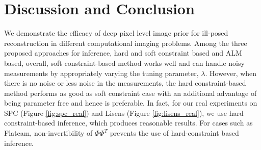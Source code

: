 \documentclass[journal,twoside]{IEEEtran}
\begin{document}
\begin{comment}




\end{comment}


\section{Discussion and Conclusion}
We demonstrate the efficacy of deep pixel level image prior for ill-posed reconstruction in different computational imaging problems. Among the three proposed approaches for inference, hard and soft constraint based and ALM based, overall, soft constraint-based method works well and can handle noisy measurements by appropriately varying the tuning parameter, $\lambda$. However, when there is no noise or less noise in the measurements, the hard constraint-based method performs as good as soft constraint case with an additional advantage of being parameter free and hence is preferable. In fact, for our real experiments on SPC (Figure \ref{fig:spc_real}) and Lisens (Figure \ref{fig:lisens_real}), we use hard constraint-based inference, which produces reasonable results. For cases such as Flatcam, non-invertibility of $\Phi \Phi^T$ prevents the use of hard-constraint based inference.
\end{document}

